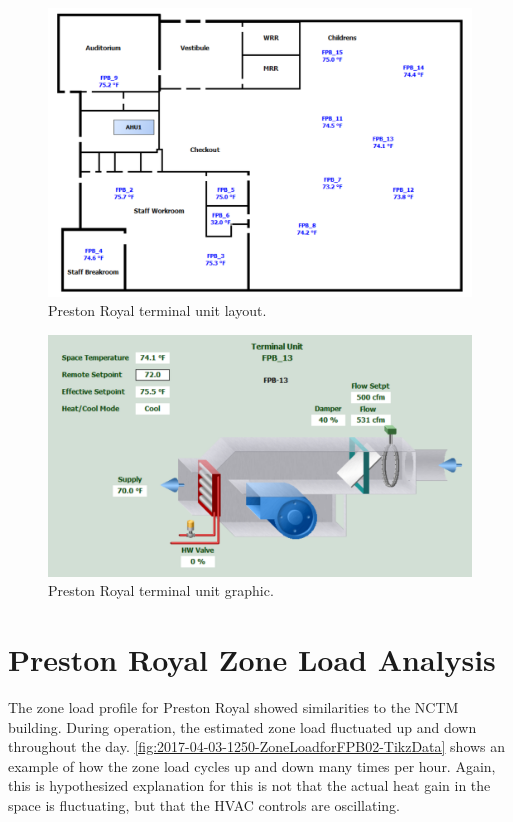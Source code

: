 \begin{figure}
\centering
\includegraphics[width=\textwidth]{Images/PrestonRoyalFPBLayoutGraphic.PNG}
\caption{Preston Royal terminal unit layout.}
\label{fig:PrestonRoyalTerminalUnitLayout}
\end{figure}

\begin{figure}
\centering
\includegraphics[width=\textwidth]{Images/PrestonRoyalTerminalUnitGraphic.PNG}
\caption{Preston Royal terminal unit graphic. }
\label{fig:PrestonRoyalTerminalUnitGraphic}
\end{figure}



\section{Preston Royal Zone Load Analysis}

The zone load profile for Preston Royal showed similarities to the NCTM
building. During operation, the estimated zone load fluctuated up and
down throughout the day. \figref{}
\ref{fig:2017-04-03-1250-ZoneLoadforFPB02-TikzData} shows an example of
how the zone load cycles up and down many times per hour. Again, this is
hypothesized explanation for this is not that the actual heat gain in
the space is fluctuating, but that the HVAC controls are oscillating. 

